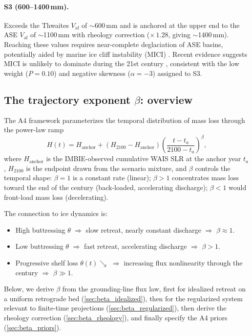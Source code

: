 \documentclass[11pt]{article}
\newcommand{\Vaf}{V_{\mathrm{af}}}
\begin{document}
\paragraph{S3 (600--1400\,mm).} Exceeds the Thwaites $\Vaf$ of $\sim$600\,mm and is anchored at the upper end to the ASE $\Vaf$ of $\sim$1100\,mm with rheology correction ($\times\,1.28$, giving $\sim$1400\,mm). Reaching these values requires near-complete deglaciation of ASE basins, potentially aided by marine ice cliff instability (MICI) \citep{Bassis2012, DeContoP2016}. Recent evidence suggests MICI is unlikely to dominate during the 21st century \citep{Morlighem2024, Clerc2019, Schlemm2022}, consistent with the low weight ($P = 0.10$) and negative skewness ($\alpha = -3$) assigned to S3.

\subsection{The trajectory exponent $\beta$: overview}
\label{sec:beta_overview}

The A4 framework parameterizes the temporal distribution of mass loss through the power-law ramp
\begin{equation}
	H(t) = H_{\mathrm{anchor}} + (H_{2100} - H_{\mathrm{anchor}})\left(\frac{t - t_a}{2100 - t_a}\right)^{\!\beta},
	\label{eq:power_law_ramp}
\end{equation}
where $H_{\mathrm{anchor}}$ is the IMBIE-observed cumulative WAIS SLR at the anchor year $t_a$, $H_{2100}$ is the endpoint drawn from the scenario mixture, and $\beta$ controls the temporal shape: $\beta = 1$ is a constant rate (linear); $\beta > 1$ concentrates mass loss toward the end of the century (back-loaded, accelerating discharge); $\beta < 1$ would front-load mass loss (decelerating).

The connection to ice dynamics is:
\begin{itemize}
	\item High buttressing $\theta$ $\Rightarrow$ slow retreat, nearly constant discharge $\Rightarrow$ $\beta \approx 1$.
	\item Low buttressing $\theta$ $\Rightarrow$ fast retreat, accelerating discharge $\Rightarrow$ $\beta > 1$.
	\item Progressive shelf loss $\theta(t) \searrow$ $\Rightarrow$ increasing flux nonlinearity through the century $\Rightarrow$ $\beta \gg 1$.
\end{itemize}

Below, we derive $\beta$ from the grounding-line flux law, first for idealized retreat on a uniform retrograde bed (\cref{sec:beta_idealized}), then for the regularized system relevant to finite-time projections (\cref{sec:beta_regularized}), then derive the rheology correction (\cref{sec:beta_rheology}), and finally specify the A4 priors (\cref{sec:beta_priors}).
\end{document}
